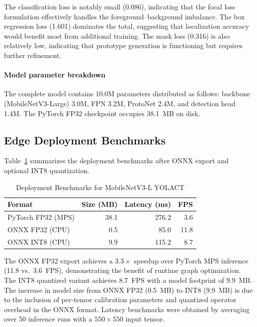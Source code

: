 \documentclass[conference]{IEEEtran}
\begin{document}
The classification loss is notably small (0.086), indicating that
the focal loss formulation effectively handles the foreground--background
imbalance. The box regression loss (1.601) dominates the total, suggesting
that localization accuracy would benefit most from additional training.
The mask loss (0.316) is also relatively low, indicating that prototype
generation is functioning but requires further refinement.

\paragraph{Model parameter breakdown}
The complete model contains 10.0M parameters distributed as follows:
backbone (MobileNetV3-Large) 3.0M, FPN 3.2M, ProtoNet 2.4M, and
detection head 1.4M. The PyTorch FP32 checkpoint occupies 38.1~MB on
disk.

\subsection{Edge Deployment Benchmarks}
\label{sec:edge_results}

Table~\ref{tab:deployment} summarizes the deployment benchmarks after
ONNX export and optional INT8 quantization.

\begin{table}[t]
  \centering
  \caption{Deployment Benchmarks for MobileNetV3-L YOLACT}
  \label{tab:deployment}
  \begin{tabular}{@{}lrrr@{}}
    \toprule
    Format & Size (MB) & Latency (ms) & FPS \\
    \midrule
    PyTorch FP32 (MPS) & 38.1 & 276.2 & 3.6 \\
    ONNX FP32 (CPU)    & 0.5  & 85.0  & 11.8 \\
    ONNX INT8 (CPU)    & 9.9  & 115.2 & 8.7 \\
    \bottomrule
  \end{tabular}
\end{table}

The ONNX FP32 export achieves a $3.3\times$ speedup over PyTorch MPS
inference (11.8 vs.\ 3.6~FPS), demonstrating the benefit of runtime
graph optimization. The INT8 quantized variant achieves 8.7~FPS with
a model footprint of 9.9~MB. The increase in model size from ONNX FP32
(0.5~MB) to INT8 (9.9~MB) is due to the inclusion of per-tensor
calibration parameters and quantized operator overhead in the ONNX
format. Latency benchmarks were obtained by averaging over 50 inference
runs with a $550 \times 550$ input tensor.
\end{document}
